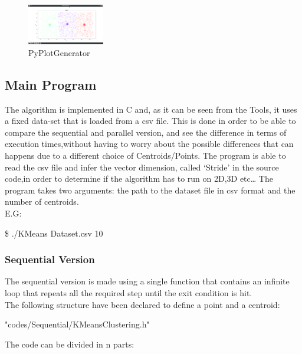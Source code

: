 \documentclass[10pt,twocolumn,letterpaper]{article}
\newenvironment{Shaded}{}{}
\newcommand{\ExtensionTok}[1]{#1}
\newcommand{\NormalTok}[1]{#1}
\begin{document}
\begin{figure}[H]
\centering
\includegraphics[width=0.3\textwidth]{Py_Plot_Generator}
\caption{PyPlotGenerator}
\end{figure}


\subsection{Main Program}
The algorithm is implemented in C and, as it can be seen from the Tools, it uses a fixed data-set that is loaded from a csv file.
\newline
This is done in order to be able to compare the sequential and parallel version, and see the difference in terms of execution 
times,without having to worry about the possible differences that can happens due to a different choice of Centroids/Points.
\newline
The program is able to read the csv file and infer the vector dimension, called `Stride' in the source code,in order to 
determine if the algorithm has to run on 2D,3D etc\ldots \newline
The program takes two arguments: the path to the dataset file in csv format and the number of centroids.\\
E.G:
\begin{Shaded}
\begin{Highlighting}[]
\NormalTok{\$ }\ExtensionTok{./KMeans} \NormalTok{ Dataset.csv 10}
\end{Highlighting}
\end{Shaded}
\subsubsection{Sequential Version}
The sequential version is made using a single function that contains an infinite loop that repeats all the required step until the exit
condition is hit.\\
The following structure have been declared to define a point and a centroid:
\begin{lstinputlisting}[language=C,style=CSnippetStyle,caption=Data Structure Definition ]{
	"codes/Sequential/KMeansClustering.h"}
\end{lstinputlisting}
The code can be divided in n parts:\\
\end{document}
